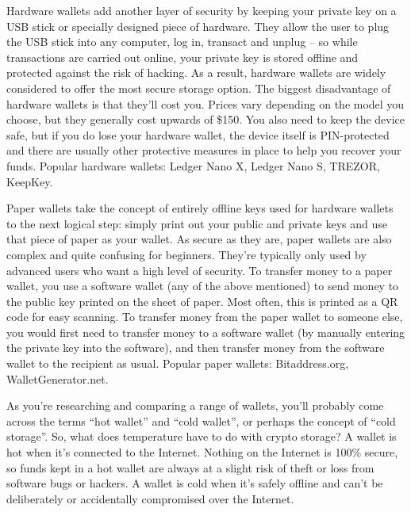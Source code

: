 Hardware wallets add another layer of security by keeping your private key on a USB stick or specially designed piece of hardware. They allow the user to plug the USB stick into any computer, log in, transact and unplug – so while transactions are carried out online, your private key is stored offline and protected against the risk of hacking. As a result, hardware wallets are widely considered to offer the most secure storage option. The biggest disadvantage of hardware wallets is that they’ll cost you. Prices vary depending on the model you choose, but they generally cost upwards of \$150. You also need to keep the device safe, but if you do lose your hardware wallet, the device itself is PIN-protected and there are usually other protective measures in place to help you recover your funds. Popular hardware wallets: Ledger Nano X, Ledger Nano S, TREZOR, KeepKey.

Paper wallets take the concept of entirely offline keys used for hardware wallets to the next logical step: simply print out your public and private keys and use that piece of paper as your wallet. As secure as they are, paper wallets are also complex and quite confusing for beginners. They’re typically only used by advanced users who want a high level of security. To transfer money to a paper wallet, you use a software wallet (any of the above mentioned) to send money to the public key printed on the sheet of paper. Most often, this is printed as a QR code for easy scanning. To transfer money from the paper wallet to someone else, you would first need to transfer money to a software wallet (by manually entering the private key into the software), and then transfer money from the software wallet to the recipient as usual. Popular paper wallets: Bitaddress.org, WalletGenerator.net.

As you’re researching and comparing a range of wallets, you’ll probably come across the terms ``hot wallet” and ``cold wallet”, or perhaps the concept of ``cold storage”. So, what does temperature have to do with crypto storage? A wallet is hot when it's connected to the Internet. Nothing on the Internet is 100\% secure, so funds kept in a hot wallet are always at a slight risk of theft or loss from software bugs or hackers. A wallet is cold when it's safely offline and can't be deliberately or accidentally compromised over the Internet.

